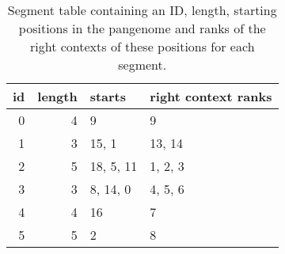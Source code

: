 \begin{table}
    \caption{
    Segment table containing an ID, length, starting positions in the pangenome and ranks of the right contexts of these positions for each segment. \label{tab:segment}}
    \begin{tabular}{rrll}
        \toprule
        id & length & starts & right context ranks \\
        \midrule
        0 & 4 & 9           & 9         \\
        1 & 3 & 15, 1       & 13, 14    \\
        2 & 5 & 18, 5, 11   & 1, 2, 3   \\
        3 & 3 & 8, 14, 0    & 4, 5, 6   \\
        4 & 4 & 16          & 7         \\
        5 & 5 & 2           & 8         \\
        \bottomrule
    \end{tabular}
\end{table}

